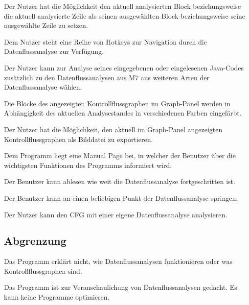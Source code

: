 Der Nutzer hat die Möglichkeit den aktuell analysierten Block beziehungsweise die aktuell analysierte Zeile als seinen ausgewählten Block beziehungsweise seine ausgewählte Zeile zu setzen.

Dem Nutzer steht eine Reihe von Hotkeys zur Navigation durch die
Datenflussanalyse zur Verfügung.

Der Nutzer kann zur Analyse seines eingegebenen oder eingelesenen Java-Codes
zusätzlich zu den Datenflussanalysen aus M7 aus weiteren Arten der Datenflussanalyse
wählen.

Die Blöcke des angezeigten Kontrollflussgraphen im Graph-Panel werden in
Abhängigkeit des aktuellen Analysestandes in verschiedenen Farben eingefärbt.

Der Nutzer hat die Möglichkeit, den aktuell im Graph-Panel angezeigten Kontrollflussgraphen als Bilddatei zu exportieren. 

Dem Programm liegt eine Manual Page bei, in welcher der Benutzer über die wichtigsten Funktionen des Programms informiert wird.

Der Benutzer kann ablesen wie weit die Datenflussanalyse fortgeschritten ist.

Der Benutzer kann an einen beliebigen Punkt der Datenflussanalyse springen.

Der Nutzer kann den CFG mit einer eigene Datenflussanalyse analysieren.

\subsection{Abgrenzung}

Das Programm erklärt nicht, wie Datenflussanalysen funktionieren oder was Kontrollflussgraphen sind.

Das Programm ist zur Veranschaulichung von Datenflussanalysen gedacht. Es kann keine Programme optimieren.

